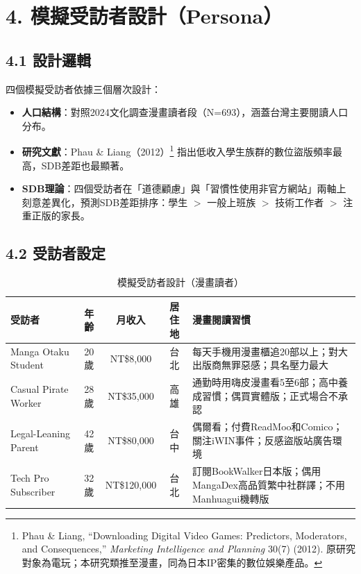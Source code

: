 \documentclass[12pt, a4paper]{article}
\begin{document}
\section{4. 模擬受訪者設計（Persona）}

\subsection{4.1 設計邏輯}

四個模擬受訪者依據三個層次設計：
\begin{itemize}
  \item \textbf{人口結構}：對照2024文化調查漫畫讀者段（N=693），涵蓋台灣主要閱讀人口分布。
  \item \textbf{研究文獻}：Phau \& Liang（2012）\footnote{Phau \& Liang, ``Downloading Digital Video Games: Predictors, Moderators, and Consequences,'' \textit{Marketing Intelligence and Planning} 30(7) (2012). 原研究對象為電玩；本研究類推至漫畫，同為日本IP密集的數位娛樂產品。} 指出低收入學生族群的數位盜版頻率最高，SDB差距也最顯著。
  \item \textbf{SDB理論}：四個受訪者在「道德顧慮」與「習慣性使用非官方網站」兩軸上刻意差異化，預測SDB差距排序：學生 $>$ 一般上班族 $>$ 技術工作者 $>$ 注重正版的家長。
\end{itemize}

\subsection{4.2 受訪者設定}

\begin{table}[H]
\centering\small
\begin{tabular}{p{2.8cm}cccp{5.5cm}}
\toprule
\textbf{受訪者} & \textbf{年齡} & \textbf{月收入} & \textbf{居住地} & \textbf{漫畫閱讀習慣} \\
\midrule
Manga Otaku Student
  & 20歲 & NT\$8,000 & 台北
  & 每天手機用漫畫櫃追20部以上；對大出版商無罪惡感；具名壓力最大 \\
Casual Pirate Worker
  & 28歲 & NT\$35,000 & 高雄
  & 通勤時用嗨皮漫畫看5至6部；高中養成習慣；偶買實體版；正式場合不承認 \\
Legal-Leaning Parent
  & 42歲 & NT\$80,000 & 台中
  & 偶爾看；付費ReadMoo和Comico；關注iWIN事件；反感盜版站廣告環境 \\
Tech Pro Subscriber
  & 32歲 & NT\$120,000 & 台北
  & 訂閱BookWalker日本版；偶用MangaDex高品質繁中社群譯；不用Manhuagui機轉版 \\
\bottomrule
\end{tabular}
\caption{模擬受訪者設計（漫畫讀者）}
\end{table}
\end{document}
